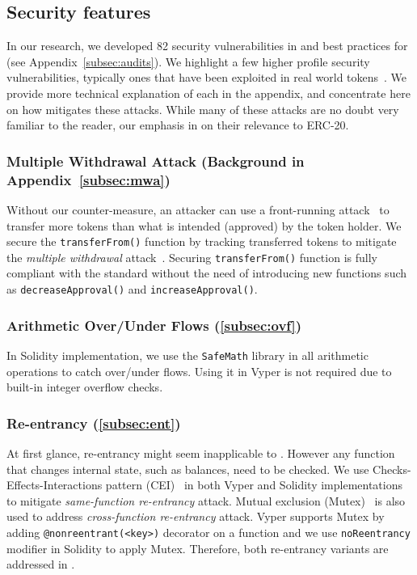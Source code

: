 \subsection{Security features}
In our research, we developed 82 security vulnerabilities in and best practices for \erc (see Appendix~\ref{subsec:audits}).  We highlight a few higher profile security vulnerabilities, typically ones that have been exploited in real world \erc tokens~\cite{SolidtySecBlog,EthSecServ,SoliditySecCon,ConsensysSecCon,LandoKL}. We provide more technical explanation of each in the appendix, and concentrate here on how \sys mitigates these attacks. While many of these attacks are no doubt very familiar to the reader, our emphasis in on their relevance to ERC-20.

\subsubsection{Multiple Withdrawal Attack (Background in Appendix~\ref{subsec:mwa})}
Without our counter-measure, an attacker can use a front-running attack~\cite{OrderingAttack,eskandari2019sok} to transfer more tokens than what is intended (approved) by the token holder. We secure the \texttt{transferFrom()} function by tracking transferred tokens to mitigate the \textit{multiple withdrawal} attack~\cite{ERC20MWA}. Securing \texttt{transferFrom()} function is fully compliant with the \erc standard without the need of introducing new functions such as \texttt{decreaseApproval()} and \texttt{increaseApproval()}. 

\subsubsection{Arithmetic Over/Under Flows (\ref{subsec:ovf})} 
In Solidity implementation, we use the \texttt{SafeMath} library in all arithmetic operations to catch over/under flows. Using it in Vyper is not required due to built-in integer overflow checks.

\subsubsection{Re-entrancy (\ref{subsec:ent})} 
At first glance, re-entrancy might seem inapplicable to \erc. However any function that changes internal state, such as balances, need to be checked. We use Checks-Effects-Interactions pattern (CEI)~\cite{CEI} in both Vyper and Solidity implementations to mitigate \textit{same-function re-entrancy} attack. Mutual exclusion (Mutex)~\cite{WiKiMutex} is also used to address \textit{cross-function re-entrancy} attack. Vyper supports Mutex by adding \texttt{@nonreentrant(<key>)} decorator on a function and we use \texttt{noReentrancy} modifier in Solidity to apply Mutex. Therefore, both re-entrancy variants are addressed in \sys. 
 
